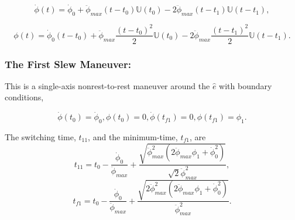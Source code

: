 \documentclass[letterpaper, paper,12pt]{AAS}		%
\begin{document}
	\begin{equation}\label{omega}
	\dot{\phi}(t)=\dot{\phi}_{0}+\ddot{\phi}_{max}(t-t_0)\mathbb{U}(t_0)- 2\ddot{\phi}_{max}(t-t_1)\mathbb{U}(t-t_1),
	\end{equation}

	\begin{equation}\label{phi}
	\phi(t)=\dot{\phi}_{0}(t-t_0)+\ddot{\phi}_{max}\frac{(t-t_0)^2}{2}\mathbb{U}(t_0)- 2\ddot{\phi}_{max}\frac{(t-t_1)^2}{2}\mathbb{U}(t-t_1).
	\end{equation}
	
	
	\subsubsection{The First Slew Maneuver:} 
	This is a single-axis nonrest-to-rest maneuver around the $\hat{e}$ with boundary conditions,

	\begin{equation}\label{Bc1}
	\dot{\phi}(t_0)=\dot{\phi}_{0},\phi(t_0)=0, \dot{\phi}(t_{f1})=0,\phi(t_{f1})=\phi_1.
	\end{equation}
	
	The switching time, $t_{11}$, and the minimum-time, $t_{f1}$, are 
	\begin{equation}\label{t11}
	t_{11}=t_0-\frac{\dot{\phi}_0}{\ddot{\phi}_{max}}+\frac{\sqrt{\ddot{\phi}_{max}^2(2\ddot{\phi}_{max}\phi_1+\dot{\phi}_{0}^2)}}{\sqrt{2}\ddot{\phi}_{max}^2},
	\end{equation}
	\begin{equation}\label{tf1}
	t_{f1}=t_0-\frac{\dot{\phi}_0}{\ddot{\phi}_{max}}+\frac{\sqrt{2\ddot{\phi}_{max}^2(2\ddot{\phi}_{max}\phi_1+\dot{\phi}_{0}^2)}}{\ddot{\phi}_{max}^2}.
	\end{equation}

	
	
\end{document}
